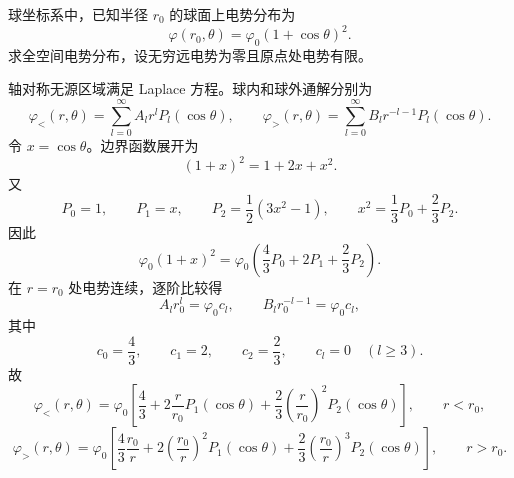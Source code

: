 \begin{question}
球坐标系中，已知半径 $r_0$ 的球面上电势分布为
\[
  \varphi(r_0,\theta)=\varphi_0(1+\cos\theta)^2 .
\]
求全空间电势分布，设无穷远电势为零且原点处电势有限。
\begin{solution}
轴对称无源区域满足 Laplace 方程。球内和球外通解分别为
\[
  \varphi_<(r,\theta)=\sum_{l=0}^{\infty}A_lr^lP_l(\cos\theta),
  \qquad
  \varphi_>(r,\theta)=\sum_{l=0}^{\infty}B_lr^{-l-1}P_l(\cos\theta) .
\]
令 $x=\cos\theta$。边界函数展开为
\[
  (1+x)^2=1+2x+x^2 .
\]
又
\[
  P_0=1,
  \qquad
  P_1=x,
  \qquad
  P_2=\frac12(3x^2-1),
  \qquad
  x^2=\frac13P_0+\frac23P_2 .
\]
因此
\[
  \varphi_0(1+x)^2
  =\varphi_0\left(\frac43P_0+2P_1+\frac23P_2\right) .
\]
在 $r=r_0$ 处电势连续，逐阶比较得
\[
  A_lr_0^l=\varphi_0c_l,
  \qquad
  B_lr_0^{-l-1}=\varphi_0c_l,
\]
其中
\[
  c_0=\frac43,
  \qquad c_1=2,
  \qquad c_2=\frac23,
  \qquad c_l=0\quad(l\geq3) .
\]
故
\[
  \boxed{\varphi_<(r,\theta)=\varphi_0\left[
  \frac43+2\frac{r}{r_0}P_1(\cos\theta)
  +\frac23\left(\frac{r}{r_0}\right)^2P_2(\cos\theta)
  \right]},\qquad r<r_0,
\]
\[
  \boxed{\varphi_>(r,\theta)=\varphi_0\left[
  \frac43\frac{r_0}{r}+2\left(\frac{r_0}{r}\right)^2P_1(\cos\theta)
  +\frac23\left(\frac{r_0}{r}\right)^3P_2(\cos\theta)
  \right]},\qquad r>r_0 .
\]
\end{solution}
\end{question}

